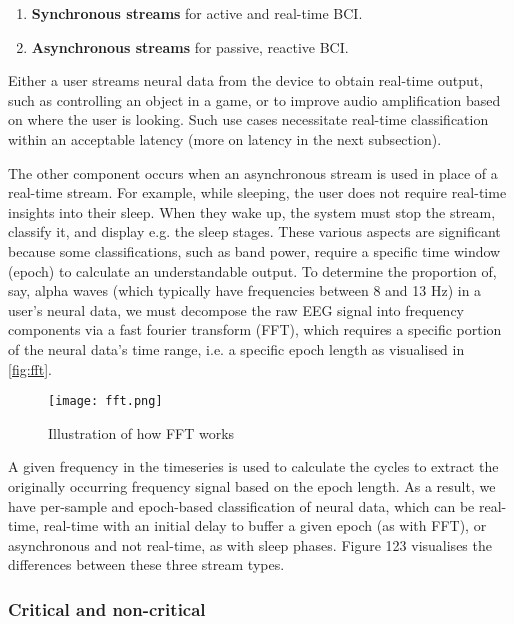 \begin{enumerate}
  \item \textbf{Synchronous streams} for active and real-time BCI.
  \item \textbf{Asynchronous streams} for passive, reactive BCI.
\end{enumerate}

Either a user streams neural data from the device to obtain real-time output, such as controlling an object in a game, or to improve audio amplification based on where the user is looking. Such use cases necessitate real-time classification within an acceptable latency (more on latency in the next subsection).

The other component occurs when an asynchronous stream is used in place of a real-time stream. For example, while sleeping, the user does not require real-time insights into their sleep. When they wake up, the system must stop the stream, classify it, and display e.g. the sleep stages. These various aspects are significant because some classifications, such as band power, require a specific time window (epoch) to calculate an understandable output. To determine the proportion of, say, alpha waves (which typically have frequencies between 8 and 13 Hz) in a user's neural data, we must decompose the raw EEG signal into frequency components via a fast fourier transform (FFT), which requires a specific portion of the neural data's time range, i.e. a specific epoch length as visualised in \autoref{fig:fft}.

\begin{figure}[!ht]
  \centering
  \texttt{[image: fft.png]}
  \caption[Illustration of how FFT works]{Illustration of how FFT works \citep{3blue1brown_but_2018}}
  \label{fig:fft}
\end{figure}

A given frequency in the timeseries is used to calculate the cycles to extract the originally occurring frequency signal based on the epoch length. As a result, we have per-sample and epoch-based classification of neural data, which can be real-time, real-time with an initial delay to buffer a given epoch (as with FFT), or asynchronous and not real-time, as with sleep phases. Figure 123 visualises the differences between these three stream types.


\subsubsection{Critical and non-critical}
\label{chapter5-critical-and-non-critical}

